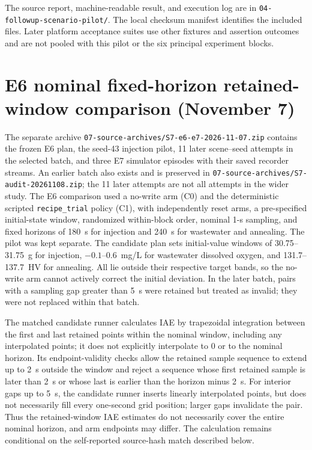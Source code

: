 \documentclass[10pt]{article}
\begin{document}
The source report, machine-readable result, and execution log are in
\texttt{04-followup-scenario-pilot/}. The local checksum manifest identifies
the included files. Later platform acceptance suites use other fixtures and
assertion outcomes and are not pooled with this pilot or the six principal
experiment blocks.

\section*{E6 nominal fixed-horizon retained-window comparison (November 7)}
The separate archive \texttt{07-source-archives/S7-e6-e7-2026-11-07.zip} contains the frozen E6 plan, the seed-43 injection pilot, 11 later scene--seed attempts in the selected batch, and three E7 simulator episodes with their saved recorder streams. An earlier batch also exists and is preserved in \texttt{07-source-archives/S7-audit-20261108.zip}; the 11 later attempts are not all attempts in the wider study. The E6 comparison used a no-write arm (C0) and the deterministic scripted \texttt{recipe\_trial} policy (C1), with independently reset arms, a pre-specified initial-state window, randomized within-block order, nominal 1-s sampling, and fixed horizons of 180~s for injection and 240~s for wastewater and annealing. The pilot was kept separate. The candidate plan sets initial-value windows of 30.75--31.75~g for injection, $-0.1$--0.6~mg/L for wastewater dissolved oxygen, and 131.7--137.7~HV for annealing. All lie outside their respective target bands, so the no-write arm cannot actively correct the initial deviation. In the later batch, pairs with a sampling gap greater than 5~s were retained but treated as invalid; they were not replaced within that batch.

The matched candidate runner calculates IAE by trapezoidal integration between the first and last retained points within the nominal window, including any interpolated points; it does not explicitly interpolate to 0 or to the nominal horizon. Its endpoint-validity checks allow the retained sample sequence to extend up to 2~s outside the window and reject a sequence whose first retained sample is later than 2~s or whose last is earlier than the horizon minus 2~s. For interior gaps up to 5~s, the candidate runner inserts linearly interpolated points, but does not necessarily fill every one-second grid position; larger gaps invalidate the pair. Thus the retained-window IAE estimates do not necessarily cover the entire nominal horizon, and arm endpoints may differ. The calculation remains conditional on the self-reported source-hash match described below.
\end{document}
